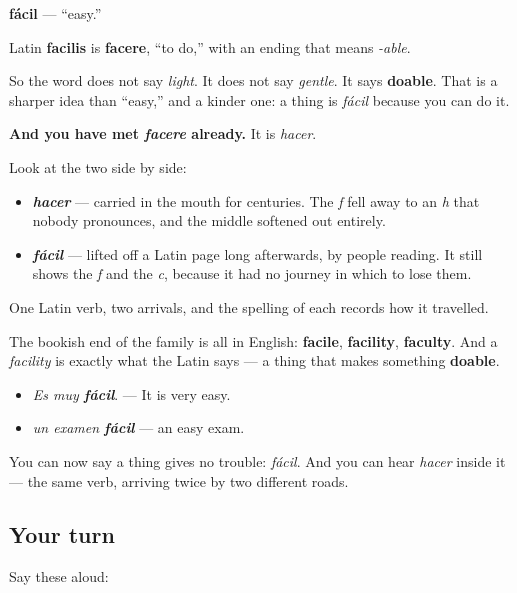 \begin{cousinweb}
\textbf{fácil} — \textquotedblleft{}easy.\textquotedblright{}

Latin \textbf{facilis} is \textbf{facere}, \textquotedblleft{}to do,\textquotedblright{} with an ending that means \emph{-able}.

So the word does not say \emph{light}. It does not say \emph{gentle}. It says \textbf{doable}. That is a sharper idea than \textquotedblleft{}easy,\textquotedblright{} and a kinder one: a thing is \emph{fácil} because you can do it.

\textbf{And you have met \emph{facere} already.} It is \emph{hacer}.

Look at the two side by side:

\begin{itemize}
\raggedright
  \item \emph{\textbf{hacer}} — carried in the mouth for centuries. The \emph{f} fell away to an \emph{h} that nobody pronounces, and the middle softened out entirely.
  \item \emph{\textbf{fácil}} — lifted off a Latin page long afterwards, by people reading. It still shows the \emph{f} and the \emph{c}, because it had no journey in which to lose them.
\end{itemize}

One Latin verb, two arrivals, and the spelling of each records how it travelled.

The bookish end of the family is all in English: \textbf{facile}, \textbf{facility}, \textbf{faculty}. And a \emph{facility} is exactly what the Latin says — a thing that makes something \textbf{doable}.

\begin{itemize}
\raggedright
  \item \emph{Es muy \textbf{fácil}}. — It is very easy.
  \item \emph{un examen \textbf{fácil}} — an easy exam.
\end{itemize}
\end{cousinweb}

\begin{grammarlens}[title={What you've built}]
You can now say a thing gives no trouble: \emph{fácil}. And you can hear \emph{hacer} inside it — the same verb, arriving twice by two different roads.
\end{grammarlens}

\subsection*{Your turn}
Say these aloud:

